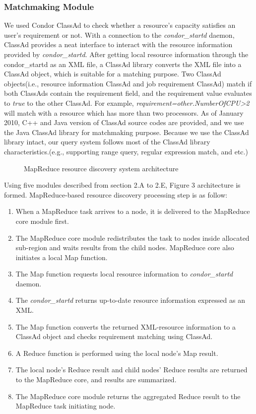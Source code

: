 \documentclass{acm_proc_article-sp}
\begin{document}
\subsubsection{Matchmaking Module}
We used Condor ClassAd\cite{classad} to check whether a resource's capacity satisfies an user's requirement or not. 
With a connection to the \textit{condor\_startd} daemon, ClassAd provides a neat interface to interact with the resource information provided by \textit{condor\_startd}. 
After getting local resource information through the condor\_startd as an XML file, a ClassAd library converts the XML file into a ClassAd object, which is suitable for a matching purpose.
Two ClassAd objects(i.e., resource information ClassAd and job requirement ClassAd) match if both ClassAds contain the requirement field, and the requirement value evaluates to \textit{true} to the other ClassAd. 
For example, \textit{requirement=other.NumberOfCPU>2} will match with a resource which has more than two processors.
As of January 2010, C++ and Java version of ClassAd source codes are provided, and we use the Java ClassAd library for matchmaking purpose. 
Because we use the ClassAd library intact, our query system follows most of the ClassAd library characteristics.(e.g., supporting range query, regular expression match, and etc.)
\begin{figure}
\centering
{}
\caption{MapReduce resource discovery system architecture}
\end{figure}

Using five modules described from section 2.A to 2.E, Figure 3 architecture is formed. MapReduce-based resource discovery processing step is as follow:
\begin{enumerate}
\setlength{\itemsep}{0pt}
\setlength{\parskip}{0pt}
\item When a MapReduce task arrives to a node, it is delivered to the MapReduce core module first.
\item The MapReduce core module redistributes the task to nodes inside allocated sub-region and waits results from the child nodes. MapReduce core also initiates a local Map function.
\item The Map function requests local resource information to \textit{condor\_startd} daemon.
\item The \textit{condor\_startd} returns up-to-date resource information expressed as an XML.
\item The Map function converts the returned XML-resource information to a ClassAd object and checks requirement matching using ClassAd.
\item A Reduce function is performed using the local node's Map result.
\item The local node's Reduce result and child nodes' Reduce results are returned to the MapReduce core, and results are summarized.
\item The MapReduce core module returns the aggregated Reduce result to the MapReduce task initiating node.
\end{enumerate}
\end{document}
